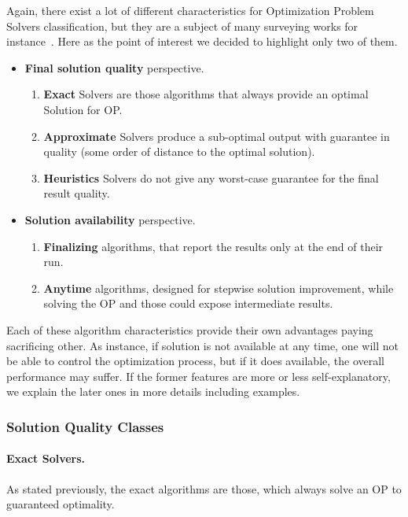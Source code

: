 Again, there exist a lot of different characteristics for Optimization Problem Solvers classification, but they are a subject of many surveying works for instance~\cite{biegler2004retrospective}. Here as the point of interest we decided to highlight only two of them.

\begin{itemize}[itemsep=8pt]
	\item \textbf{Final solution quality} perspective.
	\begin{enumerate}
		\item \textbf{Exact} Solvers are those algorithms that always provide an optimal Solution for OP.
		\item \textbf{Approximate} Solvers produce a sub-optimal output with guarantee in quality (some order of distance to the optimal solution).
		\item \textbf{Heuristics} Solvers do not give any worst-case guarantee for the final result quality.
	\end{enumerate}
	
	\item \textbf{Solution availability} perspective.
	\begin{enumerate}
		\item \textbf{Finalizing} algorithms, that report the results only at the end of their run.
		\item \textbf{Anytime} algorithms, designed for stepwise solution improvement, while solving the OP and those could expose intermediate results.
	\end{enumerate}
	
\end{itemize}

Each of these algorithm characteristics provide their own advantages paying sacrificing other. As instance, if solution is not available at any time, one will not be able to control the optimization process, but if it does available, the overall performance may suffer. 
If the former features are more or less self-explanatory, we explain the later ones in more details including examples.

\subsubsection{Solution Quality Classes}
\paragraph{Exact Solvers.}
As stated previously, the exact algorithms are those, which always solve an OP to guaranteed optimality.

